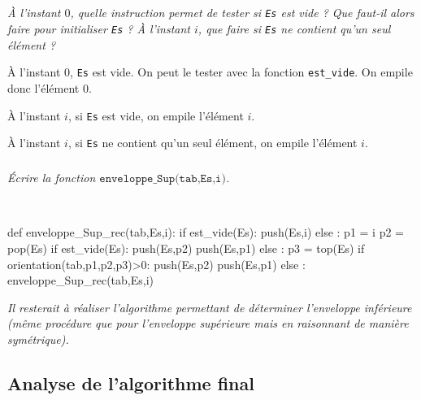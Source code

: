\documentclass[10pt,fleqn]{article} %
\begin{document}
\subparagraph{}
\textit{À l'instant $0$, quelle instruction permet de tester si \texttt{Es} est vide ? Que faut-il alors faire pour initialiser \texttt{Es} ? À l'instant $i$, que faire si \texttt{Es} ne contient qu'un seul élément ?}
\ifprof
\begin{corrige}
À l'instant $0$, \texttt{Es} est vide. On peut le tester avec la fonction \texttt{est\_vide}. On empile donc l'élément $0$. 

À l'instant $i$, si \texttt{Es} est vide, on empile l'élément $i$. 

À l'instant $i$, si \texttt{Es} ne contient qu'un seul élément, on empile l'élément $i$. 


\end{corrige}
\else
\fi

\subparagraph{}
\textit{Écrire la fonction $\texttt{enveloppe\_Sup(tab,Es,i)}$.}
\ifprof
\begin{corrige}~\\

\begin{py}
\begin{python}
def enveloppe_Sup_rec(tab,Es,i):
    if est_vide(Es):
        push(Es,i)
    else :
        p1 = i
        p2 = pop(Es)
        if est_vide(Es):
            push(Es,p2)
            push(Es,p1)
        else :
            p3 = top(Es)
            if orientation(tab,p1,p2,p3)>0:
                push(Es,p2)
                push(Es,p1)
            else :
                enveloppe_Sup_rec(tab,Es,i)
\end{python}
\end{py}
\end{corrige}             
\else
\fi

\ifprof
\else

\vspace{.5cm}
\textsl{Il resterait à réaliser l'algorithme permettant de déterminer l'enveloppe inférieure (même procédure que pour l'enveloppe supérieure mais en raisonnant de manière symétrique).}
\fi

\subsection{Analyse de l'algorithme final}
\end{document}
